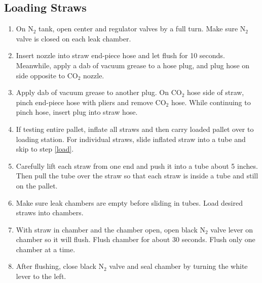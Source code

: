 \documentclass[A4,12pt]{article}
\begin{document}
    
    


\subsection{Loading Straws} \label{performing test}
	\begin{enumerate}
		\item On N$_2$ tank, open center and regulator valves by a full turn. Make sure N$_2$ valve is closed on each leak chamber.
		\item Insert nozzle into straw end-piece hose and let flush for 10 seconds. Meanwhile, apply a dab of vacuum grease to a hose plug, and plug hose on side opposite to CO$_2$ nozzle. \label{1}
		\item Apply dab of vacuum grease to another plug. On CO$_2$ hose side of straw, pinch end-piece hose with pliers and remove CO$_2$ hose. While continuing to pinch hose, insert plug into straw hose.
		\item If testing entire pallet, inflate all straws and then carry loaded pallet over to loading station.  For individual straws, slide inflated straw into a tube and skip to step \ref{load}.
		\item Carefully lift each straw from one end and push it into a tube about 5 inches.  Then pull the tube over the straw so that each straw is inside a tube and still on the pallet.
        \item Make sure leak chambers are empty before sliding in tubes.  Load desired straws into chambers. \label{load}
		\item With straw in chamber and the chamber open, open black N$_2$ valve lever on chamber so it will flush.  Flush chamber for about 30 seconds.  Flush only one chamber at a time. \label{flush}
		\item After flushing, close black N$_2$ valve and seal chamber by turning the white lever to the left.  
        
\end{enumerate}
\end{document}
